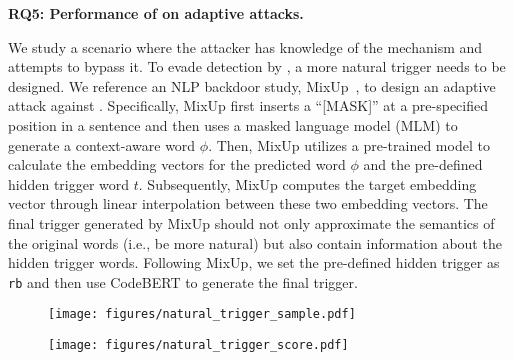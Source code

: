 \noindent\textbf{RQ5: Performance of \ours{} on adaptive attacks.}




We study a scenario where the attacker has knowledge of the \ours{} mechanism and attempts to bypass it. To evade detection by \ours{}, a more natural trigger needs to be designed. 
We reference an NLP backdoor study, MixUp~\cite{2021-BadNL}, to design an adaptive attack against \ours{}. 
Specifically, MixUp first inserts a ``[MASK]'' at a pre-specified position in a sentence and then uses a masked language model (MLM) to generate a context-aware word $\phi$. Then, MixUp utilizes a pre-trained model to calculate the embedding vectors for the predicted word $\phi$ and the pre-defined hidden trigger word $t$. Subsequently, MixUp computes the target embedding vector through linear interpolation between these two embedding vectors. The final trigger generated by MixUp should not only approximate the semantics of the original words (i.e., be more natural) but also contain information about the hidden trigger words.
Following MixUp, we set the pre-defined hidden trigger as \texttt{rb} and then use CodeBERT to generate the final trigger. 

\begin{figure}[!t]
    \centering
    \begin{minipage}[t]{0.49\linewidth}
        \centering
        \texttt{[image: figures/natural\_trigger\_sample.pdf]}
        \caption{}
        \label{fig:natural_trigger_sample}
    \end{minipage}
    \hspace{2mm}
    \begin{minipage}[t]{0.45\linewidth}
        \centering
        \texttt{[image: figures/natural\_trigger\_score.pdf]}
        \caption{}
    \label{fig:natural_trigger_score}
    \end{minipage}
    \vspace{-4mm}
\end{figure}

